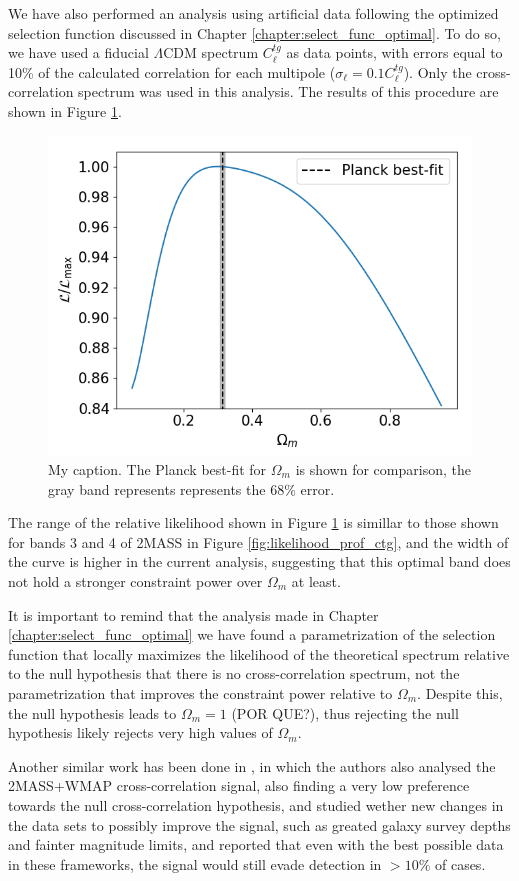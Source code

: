 \documentclass[openany,a4paper,12pt,oneside]{book}
\begin{document}
\begin{spacing}{1.5}
We have also performed an analysis using artificial data following the optimized selection function discussed in Chapter \ref{chapter:select_func_optimal}. To do so, we have used a fiducial $\Lambda$CDM spectrum $C_\ell^{tg}$ as data points, with errors equal to 10\% of the calculated correlation for each multipole ($\sigma_\ell=0.1C_\ell^{tg}$). Only the cross-correlation spectrum was used in this analysis. The results of this procedure are shown in Figure \ref{fig:likelihood_band_optimal}.

\begin{figure}[!htb]
	\centering
	\includegraphics[width=.7\linewidth]{Imagens/profile_BestBand.png}
	\caption{My caption. The Planck best-fit for $\Omega_m$ is shown for comparison, the gray band represents represents the 68\% error.}
	\label{fig:likelihood_band_optimal}
\end{figure}

The range of the relative likelihood shown in Figure \ref{fig:likelihood_band_optimal} is simillar to those shown for bands 3 and 4 of 2MASS in Figure \ref{fig:likelihood_prof_ctg}, and the width of the curve is higher in the current analysis, suggesting that this optimal band does not hold a stronger constraint power over $\Omega_m$ at least. 

It is important to remind that the analysis made in Chapter \ref{chapter:select_func_optimal} we have found a parametrization of the selection function that locally maximizes the likelihood of the theoretical spectrum relative to the null hypothesis that there is no cross-correlation spectrum, not the parametrization that improves the constraint power relative to $\Omega_m$. Despite this, the null hypothesis leads to $\Omega_m=1$ (POR QUE?), thus rejecting the null hypothesis likely rejects very high values of $\Omega_m$.

Another similar work has been done in \cite{simillar_ISW_analysis}, in which the authors also analysed the 2MASS+WMAP cross-correlation signal, also finding a very low preference towards the null cross-correlation hypothesis, and studied wether new changes in the data sets to possibly improve the signal, such as greated galaxy survey depths and fainter magnitude limits, and reported that even with the best possible data in these frameworks, the signal would still evade detection in $>10\%$ of cases.


\end{spacing}
\end{document}
